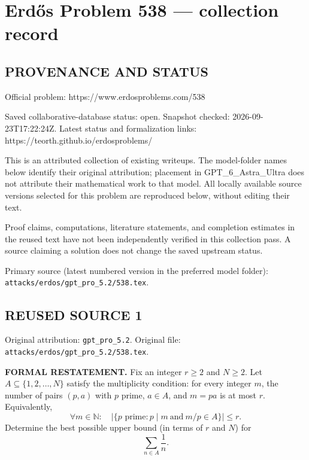 \section*{Erd\H{o}s Problem 538 --- collection record}

\subsection*{PROVENANCE AND STATUS}
Official problem: https://www.erdosproblems.com/538

Saved collaborative-database status: open.
Snapshot checked: 2026-09-23T17:22:24Z.
Latest status and formalization links: https://teorth.github.io/erdosproblems/

This is an attributed collection of existing writeups. The model-folder names below identify their original attribution; placement in GPT\_6\_Astra\_Ultra does not attribute their mathematical work to that model. All locally available source versions selected for this problem are reproduced below, without editing their text.

Proof claims, computations, literature statements, and completion estimates in the reused text have not been independently verified in this collection pass. A source claiming a solution does not change the saved upstream status.

Primary source (latest numbered version in the preferred model folder): \texttt{attacks/erdos/gpt\_pro\_5.2/538.tex}.

\subsection*{REUSED SOURCE 1}
Original attribution: \texttt{gpt\_pro\_5.2}.
Original file: \texttt{attacks/erdos/gpt\_pro\_5.2/538.tex}.


\noindent\textbf{FORMAL RESTATEMENT.}
Fix an integer $r\ge 2$ and $N\ge 2$.
Let $A\subseteq\{1,2,\dots,N\}$ satisfy the multiplicity condition:
for every integer $m$, the number of pairs $(p,a)$ with $p$ prime, $a\in A$, and $m=p a$ is at most $r$.
Equivalently,
\[
\forall m\in\mathbb N:\quad \bigl|\{p\text{ prime}: p\mid m\ \text{and}\ m/p\in A\}\bigr|\le r.
\]
Determine the best possible upper bound (in terms of $r$ and $N$) for
\[
\sum_{n\in A}\frac1n.
\]

